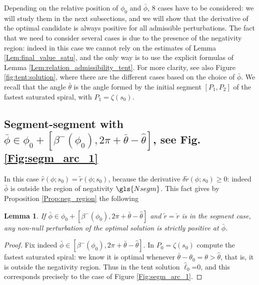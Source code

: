\documentclass[reqno]{amsart}
\theoremstyle{definition} \newtheorem{definition}{Definition}[section]
\theoremstyle{definition} \newtheorem{remark}[definition]{Remark}
\theoremstyle{plain} \newtheorem{lemma}[definition]{Lemma}
\theoremstyle{plain} \newtheorem{proposition}[definition]{Proposition}
\theoremstyle{plain} \newtheorem{theorem}[definition]{Theorem}
\theoremstyle{plain} \newtheorem{corollary}[definition]{Corollary}
\theoremstyle{definition} \newtheorem{example}[definition]{Example}
\theoremstyle{plain} \newtheorem{claim}[clai]{Claim}
\theoremstyle{definition} \newtheorem{assumption}[definition]{Assumption}
\theoremstyle{definition} \newtheorem{observation}[definition]{Observation}
\newcommand{\1}{\mathbbm 1}
\numberwithin{equation}{section} %
\theoremstyle{plain} \newtheorem*{theorem*}{Theorem}
\theoremstyle{plain} \newtheorem{mthm}[maintheorem]{Main Theorem}
\theoremstyle{plain} \newtheorem*{mthm*}{Main Theorem}
\theoremstyle{plain} \newtheorem*{conjecture*}{Conjecture}
\theoremstyle{plain} \newtheorem{conjecture}[definition]{Conjecture}
\theoremstyle{plain} \newtheorem*{problem*}{Problem}
\begin{document}
Depending on the relative position of $\phi_0$ and $\bar \phi$, $8$ cases have to be considered: we will study them in the next subsections, and we will show that the derivative of the optimal candidate is always positive for all admissible perturbations. The fact that we need to consider several cases is due to the presence of the negativity region: indeed in this case we cannot rely on the estimates of Lemma \ref{Lem:final_value_satu}, and the only way is to use the explicit formulas of Lemma \ref{Lem:relation_admissibility_tent}. For more clarity, see also Figure \ref{fig:tent:solution}, where there are the different cases based on the choice of $\bar\phi$.
We recall that the angle $\bar \theta$ is the angle formed by the initial segment $[P_1,P_2]$ of the fastest saturated spiral, with $P_1 = \zeta(s_0)$.


\subsection{Segment-segment with \texorpdfstring{$\bar \phi \in \phi_0 + [\beta^-(\phi_0),2\pi + \bar \theta - \hat \theta]$}{bar phi in beta-,2pi + bar theta - hat theta}, see Fig. \ref{Fig:segm_arc_1}}
\label{Sss:segm-segm_low}


In this case $\hat r(\phi;s_0) = \tilde r(\phi;s_0)$, because the derivative $\delta \tilde r(\phi;s_0) \geq 0$: indeed $\bar \phi$ is outside the region of negativity $\gls{Nsegm}$. This fact gives by Proposition \ref{Prop:neg_region} the following

\begin{lemma}
\label{Lem:segm_segm_1_case}
If $\bar \phi \in \phi_0 + [\beta^-(\phi_0),2\pi + \bar \theta - \hat \theta]$ and $\tilde r = \check r$ is in the segment case, any non-null perturbation of the optimal solution is strictly positive at $\bar \phi$.
\end{lemma}

\begin{proof}
Fix indeed $\bar \phi \in [\beta^{-}(\phi_0),2\pi+\bar\theta - \hat \theta]$. In $P_0=\zeta(s_0)$ compute the fastest saturated spiral: we know it is optimal whenever $\bar\theta-\theta_0=\theta>\hat\theta$, that is, it is outside the negativity region. Thus in the tent solution $\hat\ell_0$=0, and this corresponds precisely to the case of Figure \ref{Fig:segm_arc_1}.
\end{proof}
\end{document}
